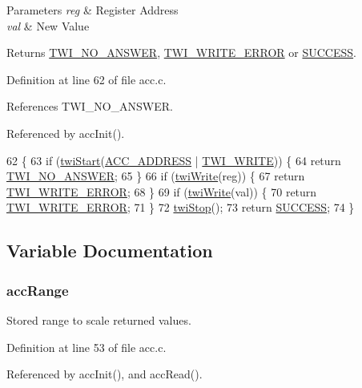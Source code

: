 \begin{DoxyParams}{Parameters}
{\em reg} & Register Address \\
\hline
{\em val} & New Value \\
\hline
\end{DoxyParams}
\begin{DoxyReturn}{Returns}
\hyperlink{group__error_gga2c3e4bb40f36b262a5214e2da2bca9c5a04d5943ba652af2205c88b247e0c659c}{T\-W\-I\-\_\-\-N\-O\-\_\-\-A\-N\-S\-W\-E\-R}, \hyperlink{group__error_gga2c3e4bb40f36b262a5214e2da2bca9c5ac0e3b3463dcaf220e54794b4711708c9}{T\-W\-I\-\_\-\-W\-R\-I\-T\-E\-\_\-\-E\-R\-R\-O\-R} or \hyperlink{group__error_gga2c3e4bb40f36b262a5214e2da2bca9c5ac7f69f7c9e5aea9b8f54cf02870e2bf8}{S\-U\-C\-C\-E\-S\-S}. 
\end{DoxyReturn}


Definition at line 62 of file acc.\-c.



References T\-W\-I\-\_\-\-N\-O\-\_\-\-A\-N\-S\-W\-E\-R.



Referenced by acc\-Init().


\begin{DoxyCode}
62                                                  \{
63     \textcolor{keywordflow}{if} (\hyperlink{group__twi_ga4f86edc73f37ce976ea2225519ab31cd}{twiStart}(\hyperlink{group__config_ga27341a8e1cb1a6ace5a5cf3caea1c99f}{ACC\_ADDRESS} | \hyperlink{group__twi_ga3b68e8e777b71520f9dbfac733774d5f}{TWI\_WRITE})) \{
64         \textcolor{keywordflow}{return} \hyperlink{group__error_gga2c3e4bb40f36b262a5214e2da2bca9c5a04d5943ba652af2205c88b247e0c659c}{TWI\_NO\_ANSWER};
65     \}
66     \textcolor{keywordflow}{if} (\hyperlink{group__twi_gaf42e50aaf4a9794d3a2c000e7b407887}{twiWrite}(reg)) \{
67         \textcolor{keywordflow}{return} \hyperlink{group__error_gga2c3e4bb40f36b262a5214e2da2bca9c5ac0e3b3463dcaf220e54794b4711708c9}{TWI\_WRITE\_ERROR};
68     \}
69     \textcolor{keywordflow}{if} (\hyperlink{group__twi_gaf42e50aaf4a9794d3a2c000e7b407887}{twiWrite}(val)) \{
70         \textcolor{keywordflow}{return} \hyperlink{group__error_gga2c3e4bb40f36b262a5214e2da2bca9c5ac0e3b3463dcaf220e54794b4711708c9}{TWI\_WRITE\_ERROR};
71     \}
72     \hyperlink{group__twi_gabf581270e9537a60e2d8cf3d2c1543d1}{twiStop}();
73     \textcolor{keywordflow}{return} \hyperlink{group__error_gga2c3e4bb40f36b262a5214e2da2bca9c5ac7f69f7c9e5aea9b8f54cf02870e2bf8}{SUCCESS};
74 \}
\end{DoxyCode}


\subsection{Variable Documentation}
\hypertarget{group__acc_ga450bb9262f697cdcab7185674b9fc6a3}{
\subsubsection[{acc\-Range}]{ acc\-Range}}\label{group__acc_ga450bb9262f697cdcab7185674b9fc6a3}


Stored range to scale returned values. 



Definition at line 53 of file acc.\-c.



Referenced by acc\-Init(), and acc\-Read().

